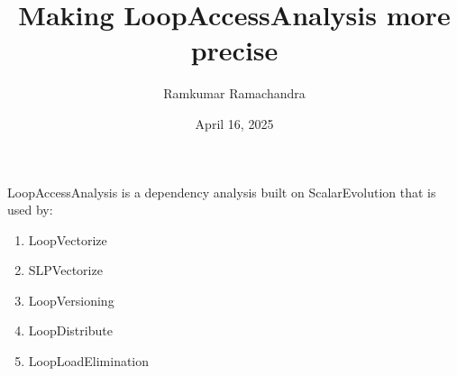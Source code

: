 \documentclass{beamer}
\title{Making LoopAccessAnalysis more precise}
\author{Ramkumar Ramachandra}
\institute{Codasip}
\date{April 16, 2025}
\begin{document}
\begin{frame}
  \titlepage
\end{frame}
\begin{frame}
  LoopAccessAnalysis is a dependency analysis built on ScalarEvolution that is used by:
  \begin{enumerate}
    \item LoopVectorize
    \item SLPVectorize
    \item LoopVersioning
    \item LoopDistribute
    \item LoopLoadElimination
  \end{enumerate}
\end{frame}
\end{document}
